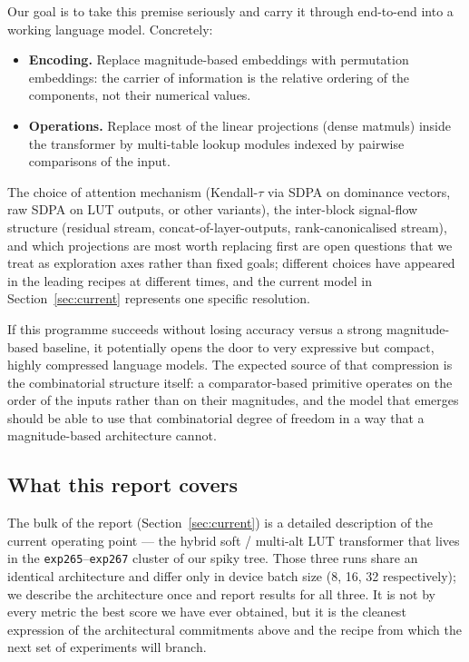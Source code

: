 \documentclass[11pt]{article}
\begin{document}
Our goal is to take this premise seriously and carry it through end-to-end into a working language model.
Concretely:
\begin{itemize}
\setlength{\itemsep}{2pt}
    \item \textbf{Encoding.} Replace magnitude-based embeddings with permutation embeddings: the carrier of information is the relative ordering of the components, not their numerical values.
    \item \textbf{Operations.} Replace most of the linear projections (dense matmuls) inside the transformer by multi-table lookup modules indexed by pairwise comparisons of the input.
\end{itemize}
The choice of attention mechanism (Kendall-$\tau$ via SDPA on dominance vectors, raw SDPA on LUT outputs, or other variants), the inter-block signal-flow structure (residual stream, concat-of-layer-outputs, rank-canonicalised stream), and which projections are most worth replacing first are open questions that we treat as exploration axes rather than fixed goals; different choices have appeared in the leading recipes at different times, and the current model in Section~\ref{sec:current} represents one specific resolution.

If this programme succeeds without losing accuracy versus a strong magnitude-based baseline, it potentially opens the door to very expressive but compact, highly compressed language models.
The expected source of that compression is the combinatorial structure itself: a comparator-based primitive operates on the order of the inputs rather than on their magnitudes, and the model that emerges should be able to use that combinatorial degree of freedom in a way that a magnitude-based architecture cannot.

\subsection{What this report covers}

The bulk of the report (Section~\ref{sec:current}) is a detailed description of the current operating point --- the hybrid soft / multi-alt LUT transformer that lives in the \texttt{exp265}--\texttt{exp267} cluster of our spiky tree.
Those three runs share an identical architecture and differ only in device batch size (8, 16, 32 respectively); we describe the architecture once and report results for all three.
It is not by every metric the best score we have ever obtained, but it is the cleanest expression of the architectural commitments above and the recipe from which the next set of experiments will branch.
\end{document}
